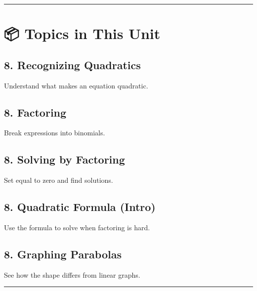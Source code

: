 \documentclass[
  letterpaper,
  DIV=11,
  numbers=noendperiod]{scrreprt}
\begin{document}
\begin{center}\rule{0.5\linewidth}{0.5pt}\end{center}

\section*{📦 Topics in This Unit}\label{topics-in-this-unit-7}


\subsection*{8. Recognizing Quadratics}\label{recognizing-quadratics}

Understand what makes an equation quadratic.

\subsection*{8. Factoring}\label{factoring}

Break expressions into binomials.

\subsection*{8. Solving by Factoring}\label{solving-by-factoring}

Set equal to zero and find solutions.

\subsection*{8. Quadratic Formula
(Intro)}\label{quadratic-formula-intro}

Use the formula to solve when factoring is hard.

\subsection*{8. Graphing Parabolas}\label{graphing-parabolas}

See how the shape differs from linear graphs.

\begin{center}\rule{0.5\linewidth}{0.5pt}\end{center}
\end{document}
